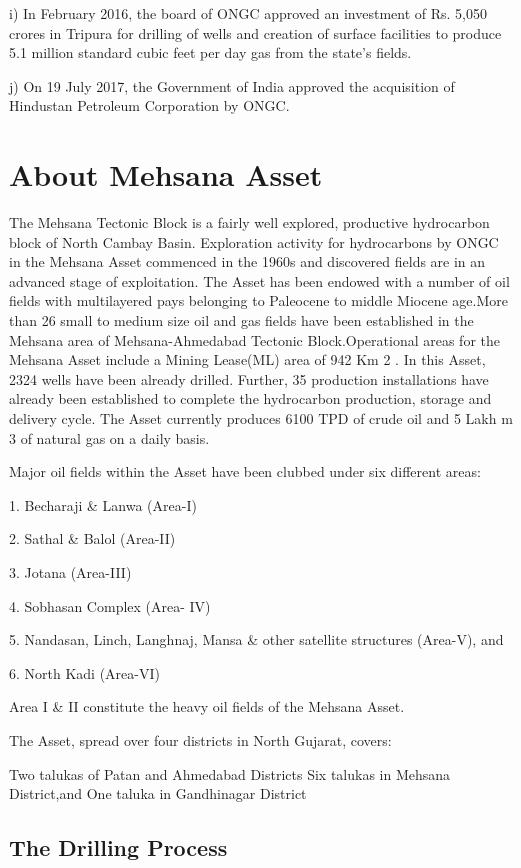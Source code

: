 \documentclass[11pt,a4paper]{article}
\begin{document}
i) In February 2016, the board of ONGC approved an investment of Rs. 5,050 crores in Tripura for drilling of wells and creation of surface facilities to produce 5.1 million standard cubic feet per day gas from the state's fields.

j) On 19 July 2017, the Government of India approved the acquisition of Hindustan Petroleum Corporation by ONGC.

\section{About Mehsana Asset}

The Mehsana Tectonic Block is a fairly well explored, productive hydrocarbon block of North Cambay Basin. Exploration activity for hydrocarbons by ONGC in the Mehsana Asset commenced in the 1960s and discovered fields are in an advanced stage of exploitation. The Asset has been endowed with a number of oil fields with multilayered pays belonging to Paleocene to middle Miocene age.More than 26 small to medium size oil and gas fields have been established in the Mehsana area of Mehsana-Ahmedabad Tectonic Block.Operational areas for the Mehsana Asset include a Mining Lease(ML) area of 942 Km 2 . In this Asset, 2324 wells have been already
drilled. Further, 35 production installations have already been established to complete the hydrocarbon production, storage and delivery cycle. The Asset currently produces 6100 TPD of crude oil and 5 Lakh m 3 of natural gas on a daily basis.

Major oil fields within the Asset have been clubbed under six different areas:

1. Becharaji \& Lanwa (Area-I)

2. Sathal \& Balol (Area-II)

3. Jotana (Area-III)

4. Sobhasan Complex (Area- IV)

5. Nandasan, Linch, Langhnaj, Mansa \& other satellite structures (Area-V), and

6. North Kadi (Area-VI)

Area I \& II constitute the heavy oil fields of the Mehsana Asset.

The Asset, spread over four districts in North Gujarat, covers:

Two talukas of Patan and Ahmedabad Districts Six talukas in Mehsana District,and One taluka in Gandhinagar District

\subsection{\textbf{The Drilling Process}}
\end{document}
